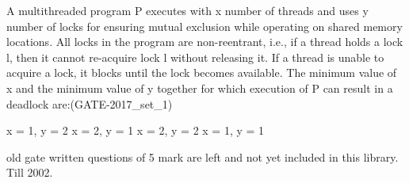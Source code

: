 
\begin{questyle}

  \question  A multithreaded program P executes with x number of threads and uses y number of locks for ensuring
            mutual exclusion while operating on shared memory locations. All locks in the program are
            non-reentrant, i.e., if a thread holds a lock l, then it cannot re-acquire lock l without
            releasing it. If a thread is unable to acquire a lock, it blocks until the lock becomes available.
            The minimum value of x and the minimum value of y together for which execution of P can result
            in a deadlock are:(GATE-2017\_set\_1)

  \begin{choices}
    \choice x = 1, y = 2
    \choice x = 2, y = 1
    \choice x = 2, y = 2
    \choice x = 1, y = 1
  \end{choices}

  \end{questyle}




old gate written questions of 5 mark  are left and not yet included in this library. Till 2002.



